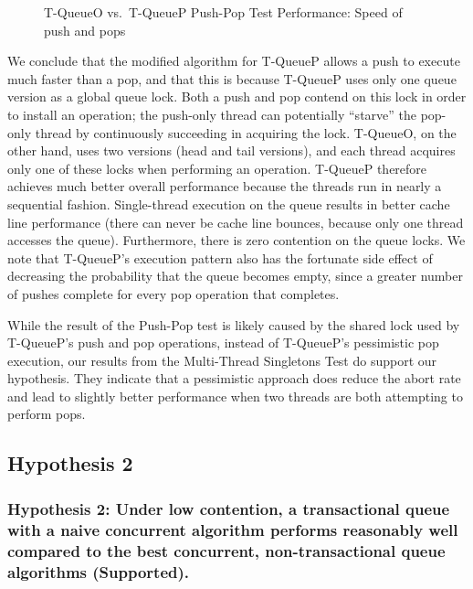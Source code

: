 \begin{figure}[t]
    \centering
    \caption{T-QueueO vs.\ T-QueueP Push-Pop Test Performance: Speed of push and pops}
    \label{fig:sto_progress}
\end{figure}

We conclude that the modified algorithm for T-QueueP allows a push to execute much faster than a pop, and that this is because T-QueueP uses only one queue version as a global queue lock. Both a push and pop contend on this lock in order to install an operation; the push-only thread can potentially ``starve'' the pop-only thread by continuously succeeding in acquiring the lock.
T-QueueO, on the other hand, uses two versions (head and tail versions), and each thread acquires only one of these locks when performing an operation.
T-QueueP therefore achieves much better overall performance because the threads run in nearly a sequential fashion.
Single-thread execution on the queue results in better cache line performance (there can never be cache line bounces, because only one thread accesses the queue). Furthermore, there is zero contention on the queue locks. 
We note that T-QueueP's execution pattern also has the fortunate side effect of decreasing the probability that the queue becomes empty, since a greater number of pushes complete for every pop operation that completes.

While the result of the Push-Pop test is likely caused by the shared lock used by T-QueueP's push and pop operations, instead of T-QueueP's pessimistic pop execution, our results from the Multi-Thread Singletons Test do support our hypothesis. They indicate that a pessimistic approach does reduce the abort rate and lead to slightly better performance when two threads are both attempting to perform pops.

\vspace{12pt}
\noindent{}


\subsection{Hypothesis 2}
\subsubsection{Hypothesis 2: Under low contention, a transactional queue with a naive concurrent algorithm performs reasonably well compared to the best concurrent, non-transactional queue algorithms (Supported).}

